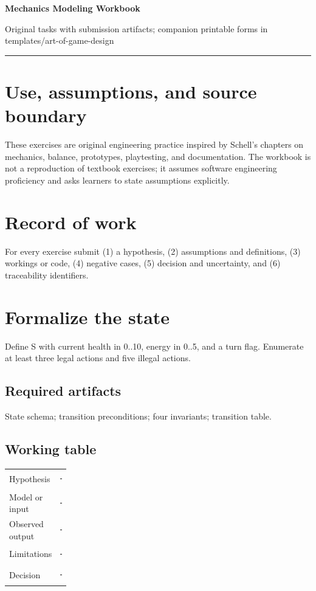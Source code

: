 \documentclass[11pt]{article}
\begin{document}
{\huge\bfseries\color{suiteblue} Mechanics Modeling Workbook}\par
\vspace{0.15in}
{\normalsize\color{suitegray} Original tasks with submission artifacts; companion printable forms in templates/art-of-game-design}\par
\vspace{0.15in}\hrule\vspace{0.15in}

\section{Use, assumptions, and source boundary}
These exercises are original engineering practice inspired by Schell's chapters on mechanics, balance, prototypes, playtesting, and documentation. The workbook is not a reproduction of textbook exercises; it assumes software engineering proficiency and asks learners to state assumptions explicitly.


\section{Record of work}
For every exercise submit (1) a hypothesis, (2) assumptions and definitions, (3) workings or code, (4) negative cases, (5) decision and uncertainty, and (6) traceability identifiers.


\section{Formalize the state}
Define S with current health in 0..10, energy in 0..5, and a turn flag. Enumerate at least three legal actions and five illegal actions.


\subsection{Required artifacts}
State schema; transition preconditions; four invariants; transition table.


\subsection{Working table}
\begin{tabularx}{\linewidth}{@{}p{0.20\linewidth}X@{}}\toprule
Hypothesis & \rule{0.90\linewidth}{0.4pt}\\[0.35cm]
Model or input & \rule{0.90\linewidth}{0.4pt}\\[0.35cm]
Observed output & \rule{0.90\linewidth}{0.4pt}\\[0.35cm]
Limitations & \rule{0.90\linewidth}{0.4pt}\\[0.35cm]
Decision & \rule{0.90\linewidth}{0.4pt}\\\bottomrule\end{tabularx}
\end{document}
